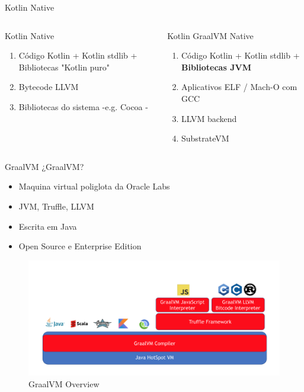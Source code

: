\documentclass[aspectratio=169]{beamer}
\begin{document}
\begin{frame}{Kotlin Native}
	\begin{columns}[T] %

		\begin{column}[T]{6cm} %
			Kotlin Native
		\begin{enumerate}
		\item Código Kotlin + Kotlin stdlib + Bibliotecas "Kotlin puro"
		\item Bytecode LLVM
		\item Bibliotecas do sistema -e.g. Cocoa -
		\end{enumerate}
		\end{column}
		\begin{column}[T]{6cm} %
        Kotlin GraalVM Native
        \begin{enumerate}
        \item Código Kotlin + Kotlin stdlib + \textbf{Bibliotecas JVM}
        \item Aplicativos ELF / Mach-O com GCC
        \item LLVM backend
        \item SubstrateVM
        \end{enumerate}

		\end{column}
	\end{columns}
\end{frame}


\begin{frame}{GraalVM}
¿GraalVM?
	\begin{itemize}
		\item Maquina virtual poliglota da Oracle Labs
		\item JVM, Truffle, LLVM
        \item Escrita em Java
        \item Open Source e Enterprise Edition
	\end{itemize}
\end{frame}


\begin{frame}{}
\begin{figure}
	\centering
	\includegraphics[width=\linewidth]{Images/graalvm}
	\caption{GraalVM Overview}
	\label{fig:graalvm}
\end{figure}

\end{frame}
\end{document}
